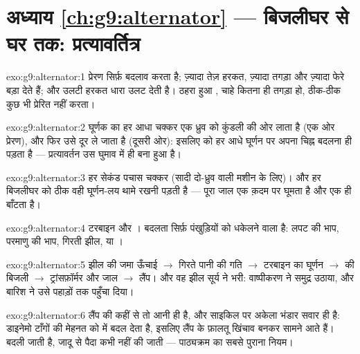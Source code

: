 \section*{अध्याय \ref{ch:g9:alternator} --- बिजलीघर से घर तक: प्रत्यावर्तित्र}

\begin{solution}{exo:g9:alternator:1}
प्रेरण सिर्फ़ बदलाव करता है; ज़्यादा तेज़ हरकत, ज़्यादा तगड़ा  और
ज़्यादा फेरे बड़ा  देते हैं; और उलटी हरकत धारा उलट देती है।
ठहरा हुआ , चाहे कितना ही तगड़ा हो, ठीक-ठीक कुछ भी प्रेरित नहीं
करता।
\end{solution}

\begin{solution}{exo:g9:alternator:2}
घूर्णक का हर आधा चक्कर एक ध्रुव को कुंडली की ओर लाता है (एक ओर प्रेरण),
और फिर उसे दूर ले जाता है (दूसरी ओर): इसलिए  को हर आधे घूर्णन
पर अपना चिह्न बदलना ही पड़ता है --- प्रत्यावर्तन उस घुमाव में ही बना
हुआ है।
\end{solution}

\begin{solution}{exo:g9:alternator:3}
हर सेकंड पचास चक्कर (सादी दो-ध्रुव वाली मशीन के लिए)। और हर बिजलीघर को
ठीक वही घूर्णन-लय थामे रखनी पड़ती है --- पूरा जाल एक क़दम पर घूमता है
और एक ही  बाँटता है।
\end{solution}

\begin{solution}{exo:g9:alternator:4}
टरबाइन और । बदलता सिर्फ़ पंखुड़ियों को धकेलने वाला है:
लपट की भाप, परमाणु की भाप, गिरती झील, या ।
\end{solution}

\begin{solution}{exo:g9:alternator:5}
झील की जमा ऊँचाई $\to$ गिरते पानी की गति $\to$ टरबाइन का घूर्णन $\to$
 की बिजली $\to$ ट्रांसफ़ॉर्मर और जाल $\to$ लैंप। और वह
झील सूर्य ने भरी: वाष्पीकरण ने समुद्र उठाया, और बारिश ने उसे पहाड़ों
तक पहुँचा दिया।
\end{solution}

\begin{solution}{exo:g9:alternator:6}
लैंप की  कहीं से तो आनी ही है, और साइकिल पर अकेला भंडार सवार ही
है: डाइनेमो टाँगों की मेहनत को  में बदल देता है, इसलिए लैंप के
 फ़ालतू खिंचाव बनकर सामने आते हैं।  बदली जाती है, जादू से पैदा
कभी नहीं की जाती --- पाठ्यक्रम का सबसे पुराना नियम।
\end{solution}

